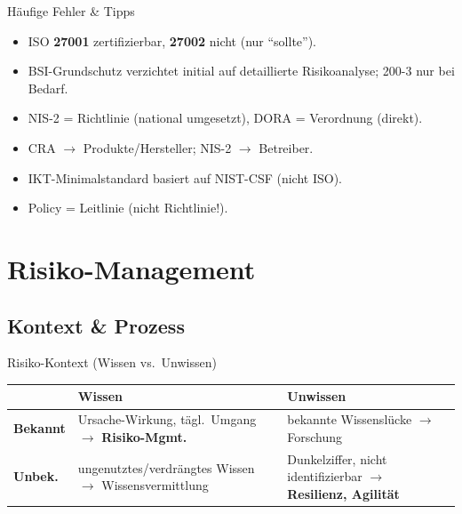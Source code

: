 \documentclass[a4paper, fontsize=7pt]{scrartcl}
\renewcommand*{\arraystretch}{1.5}  %
\begin{document}
\begin{subbox}{Häufige Fehler \& Tipps}
\begin{itemize}
    \item ISO \textbf{27001} zertifizierbar, \textbf{27002} nicht (nur ``sollte'').
    \item BSI-Grundschutz verzichtet initial auf detaillierte Risikoanalyse;
          200-3 nur bei Bedarf.
    \item NIS-2 = Richtlinie (national umgesetzt), DORA = Verordnung (direkt).
    \item CRA $\to$ Produkte/Hersteller; NIS-2 $\to$ Betreiber.
    \item IKT-Minimalstandard basiert auf NIST-CSF (nicht ISO).
    \item Policy = Leitlinie (nicht Richtlinie!).
\end{itemize}
\end{subbox}

\section{Risiko-Management}

\subsection{Kontext \& Prozess}

\begin{mainbox}{Risiko-Kontext (Wissen vs.\ Unwissen)}
\renewcommand*{\arraystretch}{1.2}
\begin{tabularx}{\linewidth}{@{}l|X|X@{}}
& \textbf{Wissen} & \textbf{Unwissen} \\
\hline
\textbf{Bekannt} & Ursache-Wirkung, tägl.\ Umgang $\to$ \textbf{Risiko-Mgmt.}
& bekannte Wissenslücke $\to$ Forschung \\
\hline
\textbf{Unbek.} & ungenutztes/verdrängtes Wissen $\to$ Wissensvermittlung
& Dunkelziffer, nicht identifizierbar $\to$ \textbf{Resilienz, Agilität} \\
\end{tabularx}
\end{mainbox}
\end{document}
